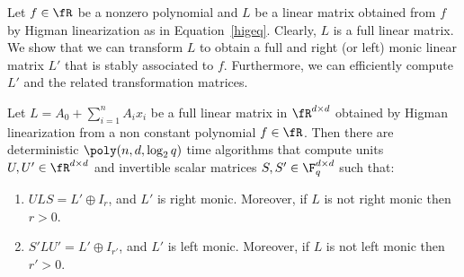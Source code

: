 Let $f\in\fR$ be a nonzero polynomial and $L$ be a linear matrix
obtained from $f$ by Higman linearization as in Equation~\ref{higeq}.
Clearly, $L$ is a full linear matrix. We show that we can transform
$L$ to obtain a full and right (or left) monic linear matrix $L'$ that is stably
associated to $f$. Furthermore, we can efficiently compute $L'$ and
the related transformation matrices.

%
%

%
%

%
%

%


\begin{theorem}{\rm\cite{Cohnfir}}\label{full-monic}
  Let $L = A_0 + \sum_{i=1}^n A_i x_i$ be a full linear matrix in
  $\fR^{d\times d}$ obtained by Higman linearization from a non
  constant polynomial $f\in\fR$. Then there are deterministic
  $\poly(n,d,\log_2 q)$ time algorithms that compute units $U, U'\in
  \fR^{d\times d}$ and invertible scalar matrices $S,
  S'\in\F_q^{d\times d}$ such that:
\begin{enumerate}  
\item $ULS= L'\oplus I_r$, and $L'$ is right monic. Moreover, if $L$
  is not right monic then $r>0$.
\item $S'LU'=L'\oplus I_{r'}$, and $L'$ is left monic. Moreover, if $L$ is
  not left monic then $r'>0$.
\end{enumerate}  
\end{theorem}

